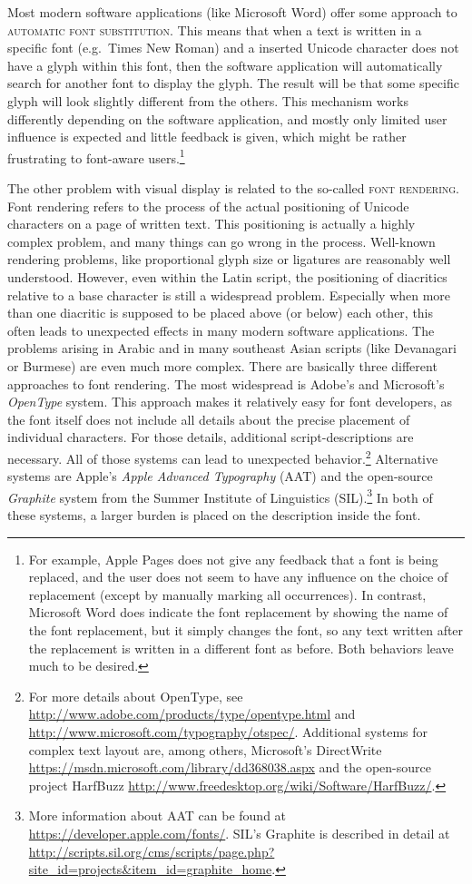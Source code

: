 Most modern software applications (like Microsoft Word) offer some approach to \textsc{automatic font substitution}. This means that when a text is written in a specific font (e.g.~Times New Roman) and a inserted Unicode character does not have a glyph within this font, then the software application will automatically search for another font to display the glyph. The result will be that some specific glyph will look slightly different from the others. This mechanism works differently depending on the software application, and mostly only limited user influence is expected and little feedback is given, which might be rather frustrating to font-aware users.\footnote{For example, Apple Pages does not give any feedback that a font is being replaced, and the user does not seem to have any influence on the choice of replacement (except by manually marking all occurrences). In contrast, Microsoft Word does indicate the font replacement by showing the name of the font replacement, but it simply changes the font, so any text written after the replacement is written in a different font as before. Both behaviors leave much to be desired.}

The other problem with visual display is related to the so-called \textsc{font rendering}. Font rendering refers to the process of the actual positioning of Unicode characters on a page of written text. This positioning is actually a highly complex problem, and many things can go wrong in the process. Well-known rendering problems, like proportional glyph size or ligatures are reasonably well understood. However, even within the Latin script, the positioning of diacritics relative to a base character is still a widespread problem. Especially when more than one diacritic is supposed to be placed above (or below) each other, this often leads to unexpected effects in many modern software applications. The problems arising in Arabic and in many southeast Asian scripts (like Devanagari or Burmese) are even much more complex. There are basically three different approaches to font rendering. The most widespread is Adobe's and Microsoft's \emph{OpenType }system. This approach makes it relatively easy for font developers, as the font itself does not include all details about the precise placement of individual characters. For those details, additional script-descriptions are necessary. All of those systems can lead to unexpected behavior.\footnote{For more details about OpenType, see \url{http://www.adobe.com/products/type/opentype.html} and \url{http://www.microsoft.com/typography/otspec/}. Additional systems for complex text layout are, among others, Microsoft's DirectWrite \url{https://msdn.microsoft.com/library/dd368038.aspx} and the open-source project HarfBuzz \url{http://www.freedesktop.org/wiki/Software/HarfBuzz/}.} Alternative systems are Apple's \emph{Apple Advanced Typography} (AAT) and the open-source \emph{Graphite} system from the Summer Institute of Linguistics (SIL).\footnote{More information about AAT can be found at \url{https://developer.apple.com/fonts/}. SIL's Graphite is described in detail at \url{http://scripts.sil.org/cms/scripts/page.php?site\_id=projects\&item\_id=graphite\_home}.} In both of these systems, a larger burden is placed on the description inside the font.

